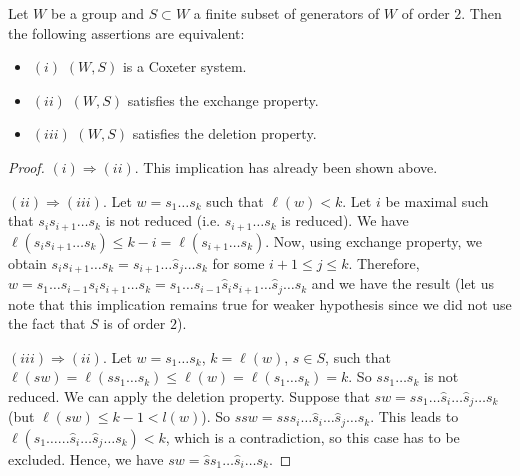 \begin{theorem} [Matsumoto]
Let $W$ be a group and $S \subset W$ a finite subset of generators of $W$ of order $2$. Then the following assertions are equivalent:
\begin{itemize}
\item $(i)$ $(W, S)$ is a Coxeter system.
\item $(ii)$ $(W, S)$ satisfies the exchange property.
\item $(iii)$ $(W,S)$ satisfies the deletion property.
\end{itemize}
\end{theorem}
\begin{proof}
$(i) \Rightarrow (ii)$. This implication has already been shown above.

$(ii) \Rightarrow (iii)$. Let $w= s_1 \ldots s_k$ such that $\ell(w) < k$. Let $i$ be maximal such that $s_i s_{i+1} \ldots s_k$ is not reduced (i.e. $s_{i+1} \ldots s_k$ is reduced). We have $\ell (s_i s_{i+1} \ldots s_k) \le k- i = \ell (s_{i+1} \ldots s_k)$. Now, using exchange property, we obtain $s_i s_{i+1} \ldots s_k = s_{i+1} \ldots \hat{s}_j \ldots s_k$ for some $i+1 \le j \le k$. Therefore, $w = s_1 \ldots s_{i-1} s_i s_{i+1} \ldots s_k = s_1 \ldots s_{i-1} \hat{s}_i s_{i+1} \ldots \hat{s}_j \ldots s_k$ and we have the result (let us note that this implication remains true for weaker hypothesis since we did not use the fact that $S$ is of order $2$).

$(iii) \Rightarrow (ii)$. Let $w= s_1 \ldots s_k$, $k = \ell (w)$, $s\in S$, such that $\ell (s w) = \ell (s s_1 \ldots s_k) \le \ell (w) = \ell (s_1 \ldots s_k ) = k$. So $s s_1 \ldots s_k$ is not reduced. We can apply the deletion property. Suppose that $s w = s s_1 \ldots \hat{s}_i \ldots \hat{s}_j \ldots s_k $ (but $\ell (sw) \le k-1 < l(w)$). So $s s w = s s s_i \ldots \hat{s}_i \ldots {\hat{s}_j} \ldots s_k$. This leads to $\ell (s_1 \ldots ... \hat{s}_i \ldots \hat{s}_j \ldots s_k ) < k$, which is a contradiction, so this case has to be excluded. Hence, we have $s w = \hat{s} s_1 \ldots \hat{s}_i  \ldots s_k $.


\end{proof}
